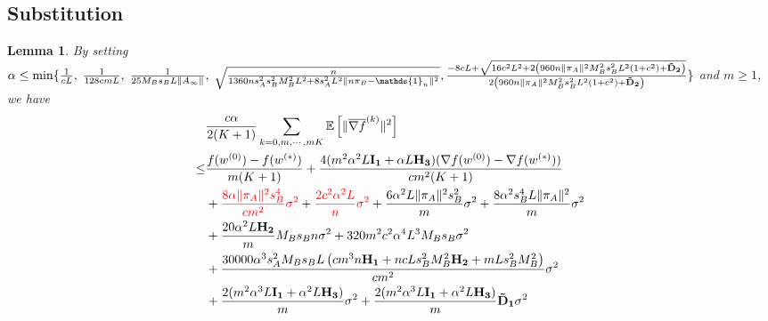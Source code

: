 \documentclass{article}
\newtheorem{lemma}[thm]{Lemma}
\newcommand{\EE}[1]{\mathbb{E}\left[#1\right]}
\newcommand{\norm}[1]{\| #1 \|}
\newcommand{\one}{\mathds{1}_n}
\begin{document}
\subsection{Substitution}
\begin{lemma}\label{Convergence Analysis and Linear Speedup-substitution}
By setting $\alpha \leq \min\{\frac{1}{cL} ,\;\frac{1}{128cmL},\;\frac{1}{25M_Bs_BL\norm{A_{\infty}}},\; \sqrt{\frac{n}{1360ns_A^2s_B^2M_B^2L^2+8s_A^2L^2\norm{n\pi_B-\one}^2}},\; \\\frac{-8cL+\sqrt{16c^2L^2+2\left(960n\norm{\pi_A}^2M_B^2s_B^2L^2\left(1+c^2\right)+\mathbf{\tilde{D}_2}\right)}}{2\left(960n\norm{\pi_A}^2M_B^2s_B^2L^2\left(1+c^2\right)+\mathbf{\tilde{D}_2}\right)}\} $ and $m\geq 1$, we have
\begin{align}
    &\frac{c\alpha }{2(K+1)}\sum_{k=0,m,\cdots,mK}\EE{\norm{\overline{\nabla f}^{(k)}}^2}\label{main-sub}
  \\\leq& \frac{f(w^{(0)})-f(w^{(*)})}{m(K+1)}+\frac{4(m^2\alpha^2L\mathbf{I_1}+\alpha L \mathbf{H_3})(\nabla f(w^{(0)})-\nabla f(w^{(*)}))}{cm^2(K+1)}\nonumber\\&+\textcolor{red}{\frac{8\alpha \norm{\pi_A}^2s_B^4}{cm^2}\sigma^2}+\textcolor{red}{ \frac{2c^2\alpha^2L}{n}\sigma^2}+\frac{6\alpha^2L\norm{\pi_A}^2s_B^2}{m}\sigma^2+\frac{8\alpha^2s_B^4L\norm{\pi_A}^2}{m}\sigma^2\nonumber\\&+\frac{20\alpha^2 L \mathbf{H_2}}{m}M_Bs_Bn \sigma^2+320m^2c^2\alpha^4L^3M_Bs_B\sigma^2\nonumber\\&+\frac{30000\alpha^3 s_A^2M_Bs_BL \left(cm^3n\mathbf{H_1}+nc Ls_B^2M_B^2\mathbf{H_2} +mLs_B^2M_B^2\right)}{cm^2}\sigma^2\nonumber\\&+\frac{2(m^2\alpha^3L\mathbf{I_1}+\alpha^2 L \mathbf{H_3})}{m}\sigma^2+\frac{2(m^2\alpha^3L\mathbf{I_1}+\alpha^2 L \mathbf{H_3})}{m}\mathbf{\tilde{D}_1}\sigma^2\nonumber
  \end{align}
\end{lemma}
\end{document}
